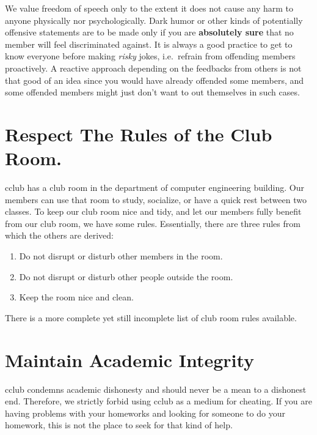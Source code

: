 \documentclass{article}
\begin{document}
We value freedom of speech only to the extent it does not cause any harm to
anyone physically nor psychologically. Dark humor or other kinds of potentially
offensive statements are to be made only if you are \textbf{absolutely sure}
that no member will feel discriminated against. It is always a good practice to
get to know everyone before making \textit{risky} jokes, i.e.\ refrain from
offending members proactively.  A reactive approach depending on the feedbacks
from others is not that good of an idea since you would have already offended
some members, and some offended members might just don't want to out themselves
in such cases.

\section*{Respect The Rules of the Club Room.}
cclub has a club room in the department of computer engineering building. Our
members can use that room to study, socialize, or have a quick rest between two
classes. To keep our club room nice and tidy, and let our members fully benefit
from our club room, we have some rules. Essentially, there are three rules from
which the others are derived:
\begin{enumerate}
		\item Do not disrupt or disturb other members in the room.
		\item Do not disrupt or disturb other people outside the room.
		\item Keep the room nice and clean.
\end{enumerate}

There is a more complete yet still incomplete list of club room rules available.

\section*{Maintain Academic Integrity}
cclub condemns academic dishonesty and should never be a mean to a dishonest end. Therefore, we strictly forbid using cclub as a medium for cheating. If you are having problems with your homeworks and looking for someone to do your homework, this is not the place to seek for that kind of help.
\end{document}
